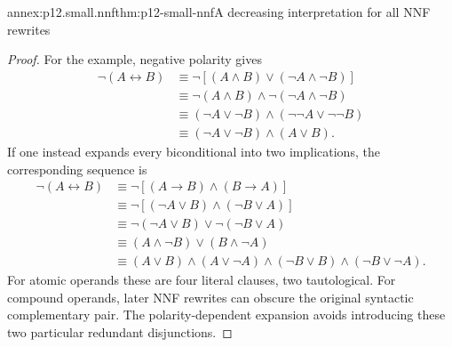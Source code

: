 \begin{annexitem}{annex:p12.small.nnf}{thm:p12-small-nnf}{A decreasing interpretation for all NNF rewrites}
\begin{proof}
For the example, negative polarity gives
\[
\begin{aligned}
\neg(A\leftrightarrow B)
&\equiv \neg[(A\land B)\lor(\neg A\land\neg B)]\\
&\equiv \neg(A\land B)\land\neg(\neg A\land\neg B)\\
&\equiv(\neg A\lor\neg B)\land(\neg\neg A\lor\neg\neg B)\\
&\equiv(\neg A\lor\neg B)\land(A\lor B).
\end{aligned}
\]
If one instead expands every biconditional into two implications,
the corresponding sequence is
\[
\begin{aligned}
\neg(A\leftrightarrow B)
&\equiv\neg[(A\to B)\land(B\to A)]\\
&\equiv\neg[(\neg A\lor B)\land(\neg B\lor A)]\\
&\equiv\neg(\neg A\lor B)\lor\neg(\neg B\lor A)\\
&\equiv(A\land\neg B)\lor(B\land\neg A)\\
&\equiv(A\lor B)\land(A\lor\neg A)
       \land(\neg B\lor B)\land(\neg B\lor\neg A).
\end{aligned}
\]
For atomic operands these are four literal clauses, two tautological.
For compound operands, later NNF rewrites can obscure the original
syntactic complementary pair. The polarity-dependent expansion
avoids introducing these two particular redundant disjunctions.
\end{proof}
\end{annexitem}

